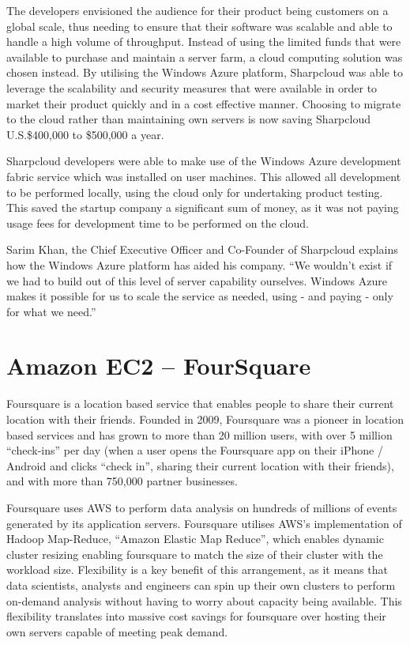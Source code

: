 The developers envisioned the audience for their product being customers on a global scale, thus needing to ensure that their software was scalable and able to handle a high volume of throughput. Instead of using the limited funds that were available to purchase and maintain a server farm, a cloud computing solution was chosen instead. By utilising the Windows Azure platform, Sharpcloud was able to leverage the scalability and security measures that were available in order to market their product quickly and in a cost effective manner. Choosing to migrate to the cloud rather than maintaining own servers is now saving Sharpcloud U.S.\$400,000 to \$500,000 a year.

Sharpcloud developers were able to make use of the Windows Azure development fabric service which was installed on user machines. This allowed all development to be performed locally, using the cloud only for undertaking product testing. This saved the startup company a significant sum of money, as it was not paying usage fees for development time to be performed on the cloud.

Sarim Khan, the Chief Executive Officer and Co-Founder of Sharpcloud explains how the Windows Azure platform has aided his company. ``We wouldn't exist if we had to build out of this level of server capability ourselves. Windows Azure makes it possible for us to scale the service as needed, using - and paying - only for what we need.''\ftSAzTwo
\ftSAzTwoText

\section{Amazon EC2 -- FourSquare}
Foursquare is a location based service that enables people to share their current location with their friends. Founded in 2009, Foursquare was a pioneer in location based services and has grown to more than 20 million users, with over 5 million ``check-ins'' per day (when a user opens the Foursquare app on their iPhone / Android and clicks ``check in'', sharing their current location with their friends), and with more than 750,000 partner businesses\ftSAmOne.
\ftSAmOneText

Foursquare uses AWS to perform data analysis on hundreds of millions of events generated by its application servers. Foursquare utilises AWS’s implementation of Hadoop Map-Reduce, ``Amazon Elastic Map Reduce'', which enables dynamic cluster resizing enabling foursquare to match the size of their cluster with the workload size. Flexibility is a key benefit of this arrangement, as it means that data scientists, analysts and engineers can spin up their own clusters to perform on-demand analysis without having to worry about capacity being available. This flexibility translates into massive cost savings for foursquare over hosting their own servers capable of meeting peak demand.

